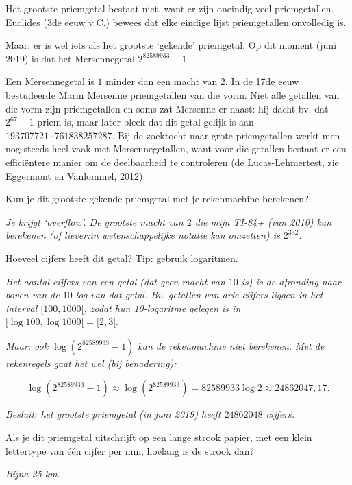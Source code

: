 
Het grootste priemgetal bestaat niet, want er zijn oneindig veel priemgetallen. Euclides (3de eeuw v.C.) bewees dat elke eindige lijst priemgetallen onvolledig is.

Maar: er is wel iets als het grootste ‘gekende’ priemgetal. Op dit moment (juni 2019) is dat het Mersennegetal $2^{82589933}-1$. 

Een Mersennegetal is $1$ minder dan een macht van $2$. In de 17de eeuw bestudeerde Marin Mersenne priemgetallen van die vorm. Niet alle getallen van die vorm zijn priemgetallen en soms zat Mersenne er naast: hij dacht bv. dat $2^{67}-1$ priem is, maar later bleek dat dit getal gelijk is aan $193707721\cdot 761838257287$. Bij de zoektocht naar grote priemgetallen werkt men nog steeds heel vaak met Mersennegetallen, want voor die getallen bestaat er een efficiëntere manier om de deelbaarheid te controleren (de Lucas-Lehmertest, zie Eggermont en Vanlommel, 2012).

\begin{werktekstoef}

\item Kun je dit grootste gekende priemgetal met je rekenmachine berekenen?

\emph{Je krijgt ‘overflow’. De grootste macht van $2$ die mijn TI-84+ (van 2010) kan berekenen (of liever:in wetenschappelijke notatie kan omzetten) is $2^{332}$.}

\item Hoeveel cijfers heeft dit getal? Tip: gebruik logaritmen.

\emph{Het aantal cijfers van een getal (dat geen macht van $10$ is) is de afronding naar boven van de $10$-log van dat getal. Bv. getallen van drie cijfers liggen in het interval $[100, 1000[$, zodat hun 10-logaritme gelegen is in $[\log{100},  \log{1000}[=[2, 3[.$}

\emph{Maar: ook $\log(2^{82589933}-1)$ kan de rekenmachine niet berekenen. Met de rekenregels gaat het wel (bij benadering):}

$$\log(2^{82589933}-1)\approx\log(2^{82589933})= 82589933 \log 2\approx 24862047,17.$$

\emph{Besluit: het grootste priemgetal (in juni 2019) heeft $24862048$ cijfers.}

\item Als je dit priemgetal uitschrijft op een lange strook papier, met een klein lettertype van \'e\'en cijfer per mm, hoelang is de strook dan?

\emph{Bijna 25 km.}

\end{werktekstoef}
\eindewerktekst

